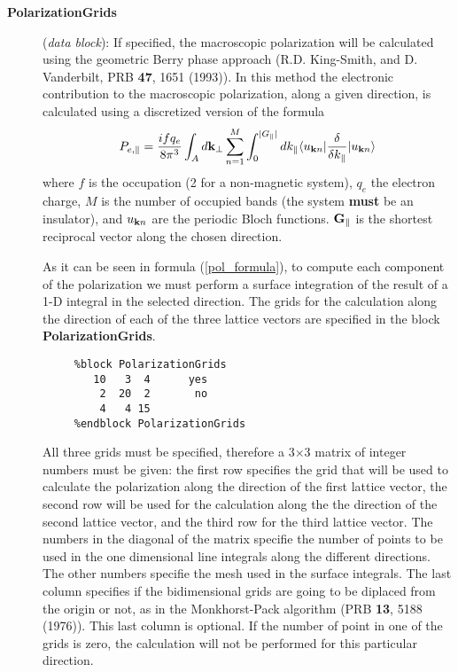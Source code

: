 \documentclass[11pt]{article}
\begin{document}
\begin{description}
\item[{\bf PolarizationGrids}] ({\it data block}):
If specified, the macroscopic polarization will be calculated using the
geometric Berry phase approach (R.D. King-Smith, and D. Vanderbilt,
PRB {\bf 47}, 1651 (1993)). In this method the electronic 
contribution to the macroscopic polarization, along a given direction, 
is calculated using
a discretized version of the formula
\begin{equation}
\label{pol_formula}
    P_{e,\parallel}={ifq_e \over 8\pi^3} \int_A d{\bf k}_\perp
    \sum_{n=1}^M \int_0^{|G_\parallel|} dk_{\parallel}
     \langle u_{{\bf k} n} |{\delta \over \delta k_{\parallel}} |
      u_{{\bf k} n} \rangle
\end{equation}
where $f$ is the occupation (2 for a non-magnetic system), 
$q_e$ the electron charge, $M$ is the number of occupied bands (the
system {\bf must} be an insulator), and $u_{{\bf k} n}$ are
the periodic Bloch functions. ${\bf G}_\parallel$ is the shortest
reciprocal vector along the chosen direction. 

As it can be seen in formula (\ref{pol_formula}), to compute each 
component of the polarization we must perform a surface integration
of the result of a 1-D integral in the selected direction. 
The grids for the calculation along the direction of each of the
three lattice vectors are specified in the block
{\bf PolarizationGrids}. 
\begin{verbatim}
     %block PolarizationGrids
        10   3  4      yes
         2  20  2       no
         4   4 15
     %endblock PolarizationGrids
\end{verbatim}      

All three grids must be specified, therefore a 3$\times$3 matrix of
integer numbers must be given: the first row specifies the grid that
will be used to calculate the polarization along the direction of the
first lattice vector, the second row will be used for the calculation
along the the direction of the second lattice vector, and the third
row for the third lattice vector.  The numbers in the diagonal of the
matrix specifie the number of points to be used in the one dimensional
line integrals along the different directions. The other numbers
specifie the mesh used in the surface integrals.  The last column
specifies if the bidimensional grids are going to be diplaced from the
origin or not, as in the Monkhorst-Pack algorithm (PRB {\bf 13}, 5188
(1976)).  This last column is optional.  If the number of point in one
of the grids is zero, the calculation will not be performed for this
particular direction.


\end{description}
\end{document}
